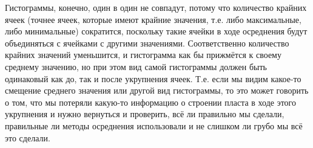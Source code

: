 Гистограммы, конечно, один в один не совпадут, потому что количество крайних ячеек (точнее ячеек, которые имеют крайние значения, т.е. либо максимальные, либо минимальные) сократится, поскольку такие ячейки в ходе осреднения будут объединяться с ячейками с другими значениями.
Соответственно количество крайних значений уменьшится, и гистограмма как бы прижмётся к своему среднему значению, но при этом вид самой гистограммы должен быть одинаковый как до, так и после укрупнения ячеек.
Т.е. если мы видим какое-то смещение среднего значения или другой вид гистограммы, то это может говорить о том, что мы потеряли какую-то информацию о строении пласта в ходе этого укрупнения и нужно вернуться и проверить, всё ли правильно мы сделали, правильные ли методы осреднения использовали и не слишком ли грубо мы всё это сделали.

